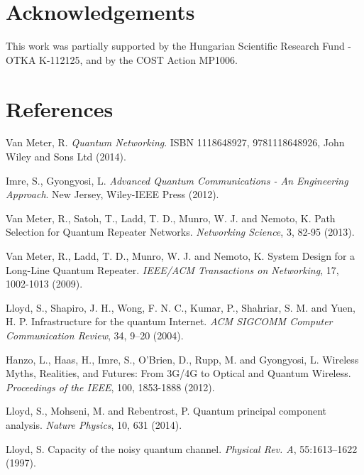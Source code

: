 \documentclass[11pt]{article}%
\begin{document}
\section*{Acknowledgements}
This work was partially supported by the Hungarian Scientific Research Fund - OTKA K-112125, and by the COST Action MP1006.
 
\section*{References}
\begin{enumerate}[ {[}1{]} ]
\item \label{ref1} Van Meter, R. \textit{Quantum Networking}. ISBN 1118648927, 9781118648926, John Wiley and Sons Ltd (2014).

\item \label{ref2} Imre, S., Gyongyosi, L. \textit{Advanced Quantum Communications - An Engineering Approach}. New Jersey, Wiley-IEEE Press (2012). 

\item \label{ref3} Van Meter, R., Satoh, T., Ladd, T. D., Munro, W. J. and Nemoto, K. Path Selection for Quantum Repeater Networks. \textit{Networking Science}, 3, 82-95 (2013).

\item \label{ref4} Van Meter, R., Ladd, T. D., Munro, W. J. and Nemoto, K. System Design for a Long-Line Quantum Repeater. \textit{IEEE/ACM Transactions on Networking}, 17, 1002-1013 (2009).

\item \label{ref5} Lloyd, S., Shapiro, J. H., Wong, F. N. C., Kumar, P., Shahriar, S. M. and Yuen, H. P. Infrastructure for the quantum Internet. \textit{ACM SIGCOMM Computer Communication Review}, 34, 9--20 (2004).

\item \label{ref6} Hanzo, L., Haas, H., Imre, S., O'Brien, D., Rupp, M. and Gyongyosi, L. Wireless Myths, Realities, and Futures: From 3G/4G to Optical and Quantum Wireless. \textit{Proceedings of the IEEE}, 100, 1853-1888 (2012).

\item \label{ref7} Lloyd, S., Mohseni, M. and Rebentrost, P. Quantum principal component analysis. \textit{Nature Physics}, 10, 631 (2014).

\item \label{ref8} Lloyd, S. Capacity of the noisy quantum channel. \textit{Physical Rev. A}, 55:1613--1622 (1997).


\end{enumerate}
\end{document}
